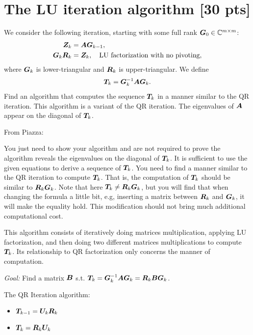 \documentclass[twoside,10pt]{article}
\begin{document}
\section{The LU iteration algorithm [30 pts]} 
We consider the following iteration, starting with some full rank $\bm{G}_0 \in \mathbb{C}^{m \times m}$:
\begin{align}
  \bm{Z}_k &= \bm{A} \bm{G}_{k - 1}, \\
  \bm{G}_{k} \bm{R}_{k} &= \bm{Z}_k, \quad \text{LU factorization with no pivoting}, 
\end{align}
where $\bm{G}_k$ is lower-triangular and $\bm{R}_{k}$ is upper-triangular.
We define 
\begin{equation}
  \bm{T}_k = \bm{G}_{k}^{-1} \bm{A} \bm{G}_k.
\end{equation}
Find an algorithm that computes the sequence $\bm{T}_{k}$ in a manner similar to the QR iteration. 
This algorithm is a variant of the QR iteration. The eigenvalues of $\bm{A}$ appear on the diagonal of $\bm{T}_k$.

From Piazza:

You just need to show your algorithm and are not required to prove the algorithm reveals the eigenvalues on the diagonal of $\bm{T}_k$.
It is sufficient to use the given equations to derive a sequence of $\bm{T}_k$.
You need to find a manner similar to the QR iteration to compute $\bm{T}_k$.
That is, the computation of  $\bm{T}_k$ should be similar to $\bm{R}_k\bm{G}_k$.
Note that here $\bm{T}_k \neq \bm{R}_k\bm{G}_k$, but you will find that when changing the formula a little bit, e.g, inserting a matrix between $\bm{R}_k$ and $\bm{G}_k$, it will make the equality hold.
This modification should not bring much additional computational cost.

This algorithm consists of iteratively doing matrices multiplication, applying LU factorization, and then doing two different matrices multiplications to compute $\bm{T}_k$.
Its relationship to QR factorization only concerns the manner of computation.

\emph{Goal:} Find a matrix $\bm{B}$ s.t. $\bm{T}_k = \bm{G}_{k}^{-1} \bm{A} \bm{G}_k = \bm{R}_k\bm{B}\bm{G}_k$.

The QR Iteration algorithm:

\begin{itemize}
  \item $\bm{T}_{k-1} = \bm{U}_k\bm{R}_k$
  \item $\bm{T}_k = \bm{R}_k\bm{U}_k$
\end{itemize}
\end{document}
